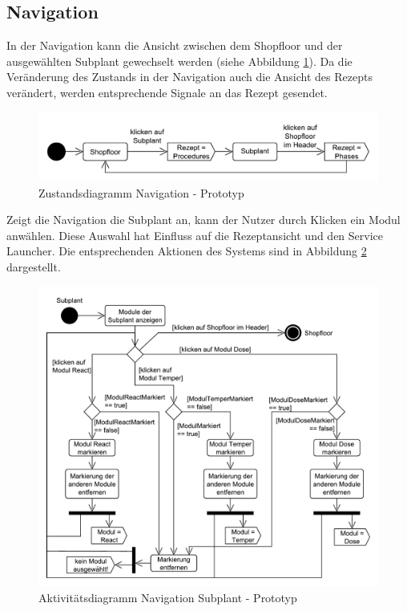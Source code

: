 \subsection{Navigation}
In der Navigation kann die Ansicht zwischen dem Shopfloor und der ausgewählten Subplant  gewechselt werden (siehe Abbildung \ref{pic:Zustandsdiagramm-Navigation}). Da die Veränderung des Zustands in der Navigation auch die Ansicht des Rezepts verändert, werden entsprechende Signale an das Rezept gesendet.
\begin{figure}[htbp]
\centering
\includegraphics[scale=0.65]{DA_files/UML/Prototyp/Zustandsdiagramm-Navigation.pdf}
\caption{Zustandsdiagramm Navigation - Prototyp}
\label{pic:Zustandsdiagramm-Navigation}
\end{figure}

Zeigt die Navigation die Subplant an, kann der Nutzer durch Klicken ein Modul anwählen. Diese Auswahl hat Einfluss auf die Rezeptansicht und den Service Launcher. Die entsprechenden Aktionen des Systems sind in Abbildung \ref{pic:Aktivitaetsdiagramm-Navigation-Subplant} dargestellt.
\begin{figure}[htbp]
\centering
\includegraphics[scale=0.6]{DA_files/UML/Prototyp/Aktivitaetsdiagramm-Navigation-Module.pdf}
\caption{Aktivitätsdiagramm Navigation Subplant - Prototyp}
\label{pic:Aktivitaetsdiagramm-Navigation-Subplant}
\end{figure}

